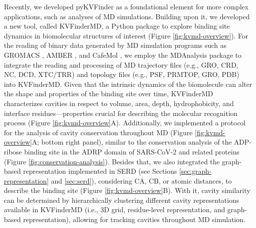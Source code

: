 \documentclass[Ingles]{phdthesis}
\def\ie{i.e.\onedot}
\def\eg{e.g.\onedot}
\begin{document}
Recently, we developed pyKVFinder \cite{guerra2021} as a foundational element for more complex applications, such as analyses of MD simulations. Building upon it, we developed a new tool, called \ac{KVFinderMD}, a Python package to explore binding site dynamics in biomolecular structures of interest (Figure \ref{fig:kvmd-overview}). For the reading of binary data generated by \acs{MD} simulation programs such as GROMACS \cite{gromacs}, AMBER \cite{amber}, and CafeMol \cite{kenzaki2011}, we employ the MDAnalysis package \cite{mdanalysis} to integrate the reading and processing of \acs{MD} trajectory files (\eg, GRO, CRD, NC, DCD, XTC/TRR) and topology files (\eg, PSF, PRMTOP, GRO, PDB) into KVFinderMD. Given that the intrinsic dynamics of the biomolecule can alter the shape and properties of the binding site over time, KVFinderMD characterizes cavities in respect to volume, area, depth, hydrophobicity, and interface residues---properties crucial for describing the molecular recognition process (Figure \ref{fig:kvmd-overview}A). Additionally, we implemented a protocol for the analysis of cavity conservation throughout MD (Figure \ref{fig:kvmd-overview}A; bottom right panel), similar to the conservation analysis of the ADP-ribose binding site in the \acs{ADRP} domain of \acs{SARS-CoV-2} and related proteins (Figure \ref{fig:conservation-analysis}). Besides that, we also integrated the graph-based representation implemented in SERD (see Sections \ref{sec:graph-representation} and \ref{sec:serd}), considering \acs{CA}, \acs{CB}, or atomic distances, to describe the binding site (Figure \ref{fig:kvmd-overview}B). With it, cavity similarity can be determined by hierarchically clustering different cavity representations available in KVFinderMD (\ie, 3D grid, residue-level representation, and graph-based representation), allowing for tracking cavities throughout \acs{MD} simulation.
\end{document}
